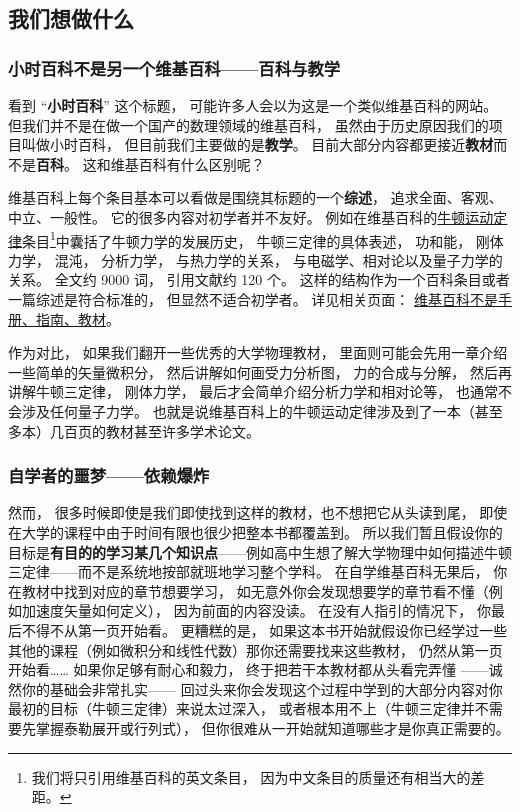 
\subsection{我们想做什么}
\subsubsection{小时百科不是另一个维基百科——百科与教学}
看到 “\textbf{小时百科}” 这个标题， 可能许多人会以为这是一个类似维基百科的网站。 但我们并不是在做一个国产的数理领域的维基百科， 虽然由于历史原因我们的项目叫做小时百科， 但目前我们主要做的是\textbf{教学}。 目前大部分内容都更接近\textbf{教材}而不是\textbf{百科}。 这和维基百科有什么区别呢？

维基百科上每个条目基本可以看做是围绕其标题的一个\textbf{综述}， 追求全面、客观、中立、一般性。 它的很多内容对初学者并不友好。 例如在维基百科的\href{https://en.wikipedia.org/wiki/Newton's_laws_of_motion}{牛顿运动定律}条目\footnote{我们将只引用维基百科的英文条目， 因为中文条目的质量还有相当大的差距。}中囊括了牛顿力学的发展历史， 牛顿三定律的具体表述， 功和能， 刚体力学， 混沌， 分析力学， 与热力学的关系， 与电磁学、相对论以及量子力学的关系。 全文约 9000 词， 引用文献约 120 个。 这样的结构作为一个百科条目或者一篇综述是符合标准的， 但显然不适合初学者。 详见相关页面： \href{https://en.wikipedia.org/wiki/Wikipedia:What_Wikipedia_is_not}{维基百科不是手册、指南、教材}。

作为对比， 如果我们翻开一些优秀的大学物理教材， 里面则可能会先用一章介绍一些简单的矢量微积分， 然后讲解如何画受力分析图， 力的合成与分解， 然后再讲解牛顿三定律， 刚体力学， 最后才会简单介绍分析力学和相对论等， 也通常不会涉及任何量子力学。 也就是说维基百科上的牛顿运动定律涉及到了一本（甚至多本）几百页的教材甚至许多学术论文。

\subsubsection{自学者的噩梦——依赖爆炸}
然而， 很多时候即使是我们即使找到这样的教材，也不想把它从头读到尾， 即使在大学的课程中由于时间有限也很少把整本书都覆盖到。 所以我们暂且假设你的目标是\textbf{有目的的学习某几个知识点}——例如高中生想了解大学物理中如何描述牛顿三定律——而不是系统地按部就班地学习整个学科。 在自学维基百科无果后， 你在教材中找到对应的章节想要学习， 如无意外你会发现想要学的章节看不懂（例如加速度矢量如何定义）， 因为前面的内容没读。 在没有人指引的情况下， 你最后不得不从第一页开始看。 更糟糕的是， 如果这本书开始就假设你已经学过一些其他的课程（例如微积分和线性代数）那你还需要找来这些教材， 仍然从第一页开始看…… 如果你足够有耐心和毅力， 终于把若干本教材都从头看完弄懂 ——诚然你的基础会非常扎实—— 回过头来你会发现这个过程中学到的大部分内容对你最初的目标（牛顿三定律）来说太过深入， 或者根本用不上（牛顿三定律并不需要先掌握泰勒展开或行列式）， 但你很难从一开始就知道哪些才是你真正需要的。

